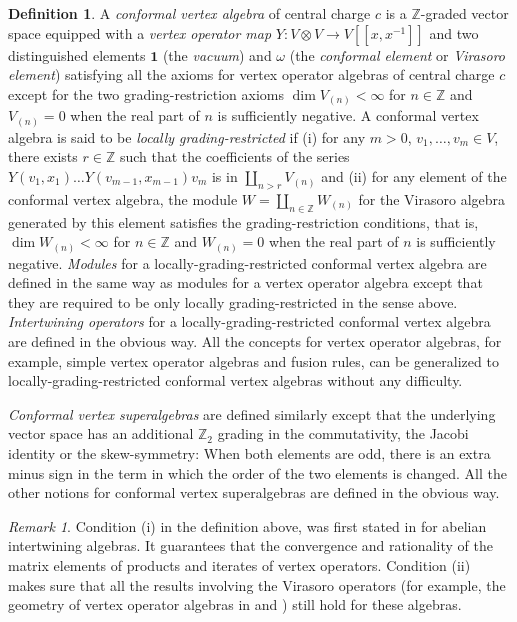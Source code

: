 \documentclass{amsproc}
\theoremstyle{definition}
\newtheorem{defn}[thm]{Definition}
\theoremstyle{remark}
\newtheorem{rema}[thm]{Remark}
\numberwithin{equation}{section}
\begin{document}
\begin{defn}
{\rm A {\it conformal vertex algebra} of central charge $c$
is a $\mathbb{Z}$-graded vector space
equipped with a {\it vertex operator map} $Y: V\otimes V\to V[[x, x^{-1}]]$
and two distinguished elements $\mathbf{1}$ (the {\it vacuum})
and $\omega$ (the  {\it conformal element} or {\it Virasoro element})
satisfying all the axioms for vertex operator algebras 
of central charge $c$
except for the two grading-restriction axioms $\dim V_{(n)}<\infty$
for $n\in \mathbb{Z}$ and  $V_{(n)}=0$ when the real part of 
$n$ is sufficiently negative. 
A conformal vertex 
algebra is said to be {\it locally grading-restricted} if (i)
for any $m>0$, $v_{1}, \dots, v_{m}\in V$, there exists
$r\in \mathbb{Z}$ such that
the coefficients of the series 
$Y(v_{1}, x_{1})\dots Y(v_{m-1}, x_{m-1})v_{m}$
is in $\coprod_{n>r}V_{(n)}$ and (ii)
for any element of the conformal vertex
algebra, the module $W=\coprod_{n\in \mathbb{Z}}W_{(n)}$ for the
Virasoro algebra generated by this element satisfies the
grading-restriction conditions, that is, $\dim W_{(n)}<\infty$ for $n\in
\mathbb{Z}$ and $W_{(n)}=0$ when the real part of $n$ is
sufficiently negative. {\it Modules}
 for a locally-grading-restricted conformal
vertex algebra are defined in the same way as modules
for a vertex operator algebra except that
they are  required to be only locally grading-restricted in the 
sense above. {\it Intertwining operators} 
for a locally-grading-restricted conformal vertex algebra are
defined in the obvious way. All the concepts for vertex operator algebras,
for example, simple vertex operator algebras and fusion 
rules, can be generalized to locally-grading-restricted 
conformal vertex algebras without any difficulty.

{\it Conformal vertex superalgebras} are defined similarly except that the 
underlying vector space has an additional $\mathbb{Z}_{2}$ grading
in the commutativity, the Jacobi identity or the skew-symmetry:
When both elements are odd,
there is an extra minus sign in the term in which the 
order of the two elements is changed. All the other notions for
conformal vertex superalgebras are defined in the obvious way.}
\end{defn}

\begin{rema}
{\rm Condition (i) in the definition above,  was first stated in 
\cite{DL2} for abelian intertwining algebras.
It guarantees that the convergence and rationality 
of the matrix elements
of products and 
iterates of vertex operators. Condition (ii) makes sure that all
the results involving the Virasoro operators (for 
example, the geometry of vertex operator algebras in \cite{H0} 
and \cite{H4.5})
still hold for these
algebras.}
\end{rema}
\end{document}

